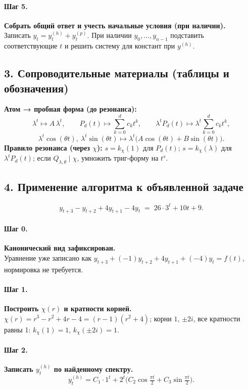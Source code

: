 \paragraph{Шаг 5.} \textbf{Собрать общий ответ и учесть начальные условия (при наличии).}\\
Записать \(y_t=y^{(h)}_t+y^{(p)}_t\). При наличии \(y_0,\dots,y_{n-1}\) подставить соответствующие \(t\) и решить систему для констант при \(y^{(h)}\).

\subsection*{3. Сопроводительные материалы (таблицы и обозначения)}

\textbf{Атом → пробная форма (до резонанса):}
\[
\lambda^{t}\mapsto A\,\lambda^{t},\qquad
P_d(t)\mapsto \sum_{k=0}^d c_k t^k,\qquad
\lambda^{t}P_d(t)\mapsto \lambda^{t}\sum_{k=0}^d c_k t^k,
\]
\[
\lambda^{t}\cos(\theta t),\ \lambda^{t}\sin(\theta t)\mapsto \lambda^{t}\big(A\cos(\theta t)+B\sin(\theta t)\big).
\]
\textbf{Правило резонанса (через \(\chi\)):} \(s=k_\chi(1)\) для \(P_d(t)\); \(s=k_\chi(\lambda)\) для \(\lambda^{t}P_d(t)\); если \(Q_{\lambda,\theta}\mid\chi\), умножить триг-форму на \(t^{s}\).

\subsection*{4. Применение алгоритма к объявленной задаче}

\[
y_{t+3}-y_{t+2}+4y_{t+1}-4y_{t} \;=\; 26\cdot 3^{t} + 10t + 9.
\]

\paragraph{Шаг 0.} \textbf{Канонический вид зафиксирован.}\\
Уравнение уже записано как \(y_{t+3}+(-1)y_{t+2}+4y_{t+1}+(-4)y_t=f(t)\), нормировка не требуется.

\paragraph{Шаг 1.} \textbf{Построить \(\chi(r)\) и кратности корней.}\\
\(\chi(r)=r^3-r^2+4r-4=(r-1)(r^2+4)\); корни \(1\), \(\pm 2i\), все кратности равны 1: \(k_\chi(1)=1\), \(k_\chi(\pm 2i)=1\).

\paragraph{Шаг 2.} \textbf{Записать \(y^{(h)}_t\) по найденному спектру.}\\
\[
y^{(h)}_t=C_1\cdot 1^{t}+2^{t}\Big(C_2\cos\tfrac{\pi t}{2}+C_3\sin\tfrac{\pi t}{2}\Big).
\]

